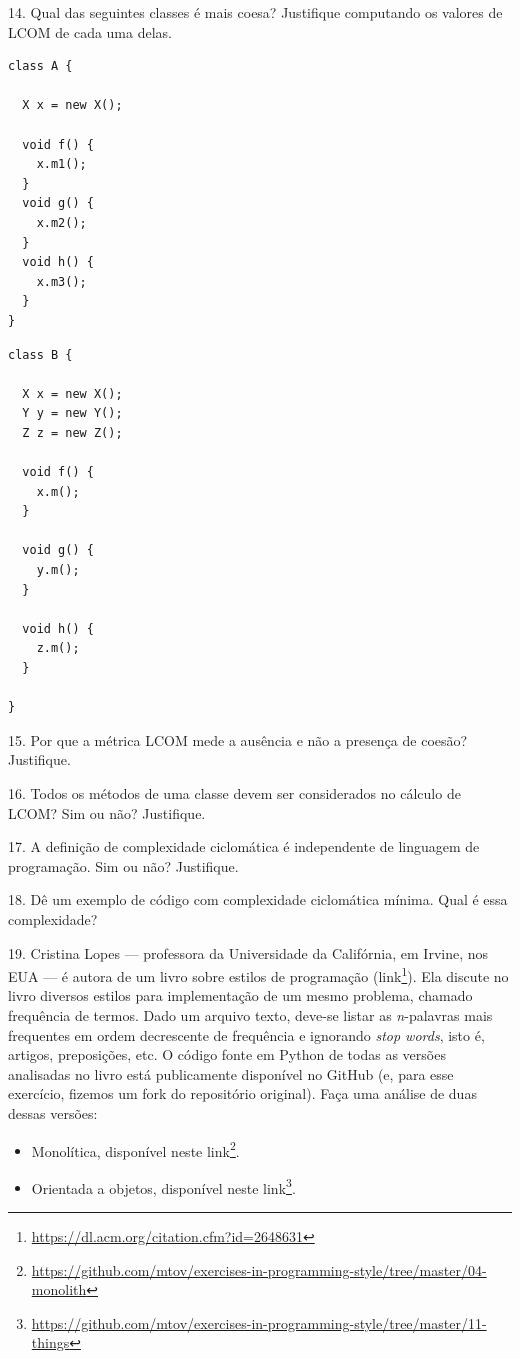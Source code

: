 \documentclass[
  11pt,
  twoside]{book}
\DeclareRobustCommand{\href}[2]{#2\footnote{\url{#1}}}
\begin{document}
14. Qual das seguintes classes é mais coesa? Justifique computando os
valores de LCOM de cada uma delas.

\begin{lstlisting}
class A {

  X x = new X();

  void f() {
    x.m1();
  }
  void g() {
    x.m2();
  }
  void h() {
    x.m3();
  }
}
\end{lstlisting}

\begin{lstlisting}
class B {

  X x = new X();
  Y y = new Y();
  Z z = new Z();

  void f() {
    x.m();
  }

  void g() {
    y.m();
  }

  void h() {
    z.m();
  }

}
\end{lstlisting}

15. Por que a métrica LCOM mede a ausência e não a presença de coesão?
Justifique.

16. Todos os métodos de uma classe devem ser considerados no cálculo de
LCOM? Sim ou não? Justifique.

17. A definição de complexidade ciclomática é independente de linguagem
de programação. Sim ou não? Justifique.

18. Dê um exemplo de código com complexidade ciclomática mínima. Qual é
essa complexidade?

19. Cristina Lopes --- professora da Universidade da Califórnia, em
Irvine, nos EUA --- é autora de um livro sobre estilos de programação
(\href{https://dl.acm.org/citation.cfm?id=2648631}{link}). Ela discute
no livro diversos estilos para implementação de um mesmo problema,
chamado frequência de termos. Dado um arquivo texto, deve-se listar as
\emph{n}-palavras mais frequentes em ordem decrescente de frequência e
ignorando \emph{stop words}, isto é, artigos, preposições, etc. O código
fonte em Python de todas as versões analisadas no livro está
publicamente disponível no GitHub (e, para esse exercício, fizemos um
fork do repositório original). Faça uma análise de duas dessas versões:

\begin{itemize}
\item
  Monolítica, disponível neste
  \href{https://github.com/mtov/exercises-in-programming-style/tree/master/04-monolith}{link}.
\item
  Orientada a objetos, disponível neste
  \href{https://github.com/mtov/exercises-in-programming-style/tree/master/11-things}{link}.
\end{itemize}
\end{document}
